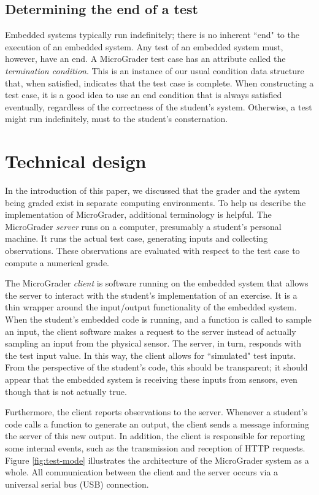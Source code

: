 \documentclass[12pt]{article}
\begin{document}
\subsection{Determining the end of a test}
Embedded systems typically run indefinitely; there is no inherent ``end" to the execution of an embedded system.  Any test of an embedded system must, however, have an end.  A MicroGrader test case has an attribute called the \textit{termination condition}.  This is an instance of our usual condition data structure that, when satisfied, indicates that the test case is complete.  When constructing a test case, it is a good idea to use an end condition that is always satisfied eventually, regardless of the correctness of the student's system.  Otherwise, a test might run indefinitely, must to the student's consternation.



\clearpage
\section{Technical design }
In the introduction of this paper, we discussed that the grader and the system being graded exist in separate computing environments.  To help us describe the implementation of MicroGrader, additional terminology is helpful.  The MicroGrader \textit{server} runs on a computer, presumably a student's personal machine.  It runs the actual test case, generating inputs and collecting observations.  These observations are evaluated with respect to the test case to compute a numerical grade.

The MicroGrader \textit{client} is software running on the embedded system that allows the server to interact with the student's implementation of an exercise.  It is a thin wrapper around the input/output functionality of the embedded system.  When the student's embedded code is running, and a function is called to sample an input, the client software makes a request to the server instead of actually sampling an input from the physical sensor.  The server, in turn, responds with the test input value.  In this way, the client allows for 	``simulated" test inputs.  From the perspective of the student's code, this should be transparent; it should appear that the embedded system is receiving these inputs from sensors, even though that is not actually true.

Furthermore, the client reports observations to the server.  Whenever a student's code calls a function to generate an output, the client sends a message informing the server of this new output.  In addition, the client is responsible for reporting some internal events, such as the transmission and reception of HTTP requests.  Figure \ref{fig:test-mode} illustrates the architecture of the MicroGrader system as a whole.  All communication between the client and the server occurs via a universal serial bus (USB) connection.
\end{document}
